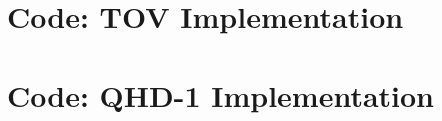 \chapter{Code: TOV Implementation}\label{ch: tov code}



\chapter{Code: QHD-1 Implementation}\label{ch: qhd1 code}



